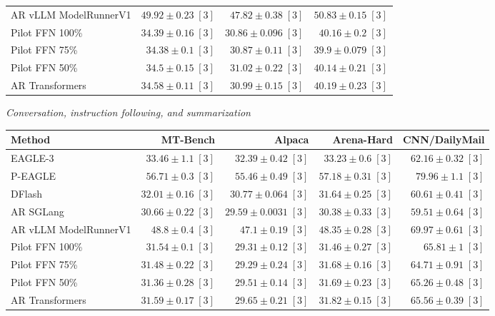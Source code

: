 \begin{table}[!htp]
\begin{tabular}{@{}>{\raggedright\arraybackslash}p{3.7cm}rrr@{}}
AR \textperiodcentered{} vLLM ModelRunnerV1 & \(49.92 \pm 0.23\;[3]\) & \(47.82 \pm 0.38\;[3]\) & \(50.83 \pm 0.15\;[3]\) \\
Pilot FFN 100\% & \(34.39 \pm 0.16\;[3]\) & \(30.86 \pm 0.096\;[3]\) & \(40.16 \pm 0.2\;[3]\) \\
Pilot FFN 75\% & \(34.38 \pm 0.1\;[3]\) & \(30.87 \pm 0.11\;[3]\) & \(39.9 \pm 0.079\;[3]\) \\
Pilot FFN 50\% & \(34.5 \pm 0.15\;[3]\) & \(31.02 \pm 0.22\;[3]\) & \(40.14 \pm 0.21\;[3]\) \\
AR \textperiodcentered{} Transformers & \(34.58 \pm 0.11\;[3]\) & \(30.99 \pm 0.15\;[3]\) & \(40.19 \pm 0.23\;[3]\) \\
\bottomrule
\end{tabular}\par\medskip
\textit{Conversation, instruction following, and summarization}\par\smallskip
\begin{tabular}{@{}>{\raggedright\arraybackslash}p{3.7cm}rrrr@{}}
\toprule
Method & MT-Bench & Alpaca & Arena-Hard & CNN/DailyMail \\
\midrule
EAGLE-3 & \(33.46 \pm 1.1\;[3]\) & \(32.39 \pm 0.42\;[3]\) & \(33.23 \pm 0.6\;[3]\) & \(62.16 \pm 0.32\;[3]\) \\
P-EAGLE & \(56.71 \pm 0.3\;[3]\) & \(55.46 \pm 0.49\;[3]\) & \(57.18 \pm 0.31\;[3]\) & \(79.96 \pm 1.1\;[3]\) \\
DFlash & \(32.01 \pm 0.16\;[3]\) & \(30.77 \pm 0.064\;[3]\) & \(31.64 \pm 0.25\;[3]\) & \(60.61 \pm 0.41\;[3]\) \\
AR \textperiodcentered{} SGLang & \(\mathbf{30.66} \pm 0.22\;[3]\) & \(29.59 \pm 0.0031\;[3]\) & \(\mathbf{30.38} \pm 0.33\;[3]\) & \(\mathbf{59.51} \pm 0.64\;[3]\) \\
AR \textperiodcentered{} vLLM ModelRunnerV1 & \(48.8 \pm 0.4\;[3]\) & \(47.1 \pm 0.19\;[3]\) & \(48.35 \pm 0.28\;[3]\) & \(69.97 \pm 0.61\;[3]\) \\
Pilot FFN 100\% & \(31.54 \pm 0.1\;[3]\) & \(29.31 \pm 0.12\;[3]\) & \(31.46 \pm 0.27\;[3]\) & \(65.81 \pm 1\;[3]\) \\
Pilot FFN 75\% & \(31.48 \pm 0.22\;[3]\) & \(\mathbf{29.29} \pm 0.24\;[3]\) & \(31.68 \pm 0.16\;[3]\) & \(64.71 \pm 0.91\;[3]\) \\
Pilot FFN 50\% & \(31.36 \pm 0.28\;[3]\) & \(29.51 \pm 0.14\;[3]\) & \(31.69 \pm 0.23\;[3]\) & \(65.26 \pm 0.48\;[3]\) \\
AR \textperiodcentered{} Transformers & \(31.59 \pm 0.17\;[3]\) & \(29.65 \pm 0.21\;[3]\) & \(31.82 \pm 0.15\;[3]\) & \(65.56 \pm 0.39\;[3]\) \\

\end{tabular}
\end{table}

